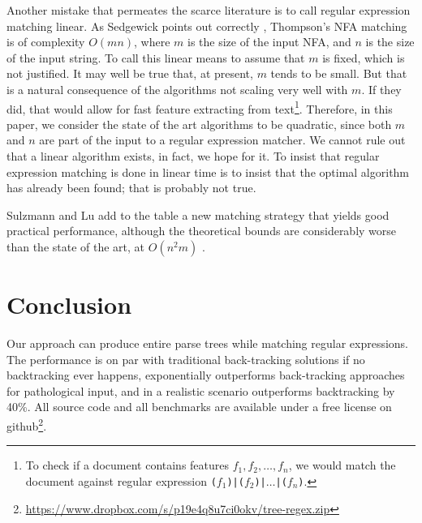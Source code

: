 \documentclass[english]{sigplanconf}
\theoremstyle{definition}
\begin{document}
Another mistake that permeates the scarce literature is to call
regular expression matching linear. As Sedgewick points out correctly
\cite{Sedg90a}, Thompson's NFA matching is of complexity $O(mn)$,
where $m$ is the size of the input NFA, and $n$ is the size of the
input string. To call this linear means to assume that $m$ is fixed,
which is not justified. It may well be true that, at present, $m$
tends to be small. But that is a natural consequence of the algorithms
not scaling very well with $m$. If they did, that would allow for
fast feature extracting from text\footnote{To check if a document
contains features $f_1, f_2, \dots, f_n$, we would match the document
against regular expression \texttt{($f_1$)|($f_2$)|$\dots$|($f_n$)}.}.
Therefore, in this paper, we consider the state of the art algorithms
to be quadratic, since both $m$ and $n$ are part of the input to a
regular expression matcher. We cannot rule out that a linear algorithm
exists, in fact, we hope for it.  To insist that regular expression
matching is done in linear time is to insist that the optimal
algorithm has already been found; that is probably not true.

Sulzmann and Lu add to the table a new matching strategy that yields
good practical performance, although the theoretical bounds are considerably
worse than the state of the art, at $O(n^{2}m)$ \cite{Sulz12a}.

\section{Conclusion}
Our approach can produce entire parse trees while matching regular
expressions.  The performance is on par with traditional back-tracking
solutions if no backtracking ever happens, exponentially outperforms
back-tracking approaches for pathological input, and in a realistic
scenario outperforms backtracking by 40\%.  All source code and all
benchmarks are available under a free license on
github\footnote{\url{https://www.dropbox.com/s/p19e4q8u7ci0okv/tree-regex.zip}}.



\end{document}
